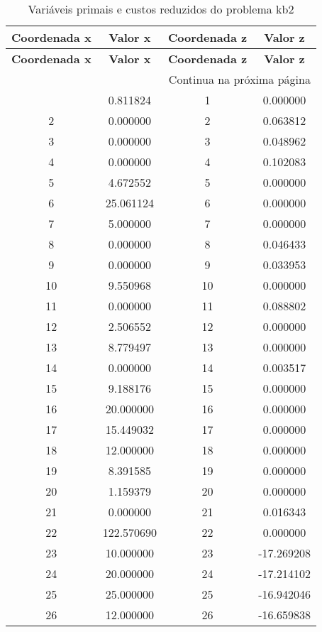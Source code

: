 \documentclass[12pt]{article}
\begin{document}
\begin{longtable}{@{}cccc@{}}
\caption{Variáveis primais e custos reduzidos do problema kb2} \\
\toprule
\textbf{Coordenada x} & \textbf{Valor x} & \textbf{Coordenada z} & \textbf{Valor z} \\
\midrule
\endfirsthead

\toprule
\textbf{Coordenada x} & \textbf{Valor x} & \textbf{Coordenada z} & \textbf{Valor z} \\
\midrule
\endhead

\midrule \multicolumn{4}{r}{{Continua na próxima página}} \\ \midrule
\endfoot

\bottomrule
\endlastfoot
1 & 0.811824 & 1 & 0.000000 \\
2 & 0.000000 & 2 & 0.063812 \\
3 & 0.000000 & 3 & 0.048962 \\
4 & 0.000000 & 4 & 0.102083 \\
5 & 4.672552 & 5 & 0.000000 \\
6 & 25.061124 & 6 & 0.000000 \\
7 & 5.000000 & 7 & 0.000000 \\
8 & 0.000000 & 8 & 0.046433 \\
9 & 0.000000 & 9 & 0.033953 \\
10 & 9.550968 & 10 & 0.000000 \\
11 & 0.000000 & 11 & 0.088802 \\
12 & 2.506552 & 12 & 0.000000 \\
13 & 8.779497 & 13 & 0.000000 \\
14 & 0.000000 & 14 & 0.003517 \\
15 & 9.188176 & 15 & 0.000000 \\
16 & 20.000000 & 16 & 0.000000 \\
17 & 15.449032 & 17 & 0.000000 \\
18 & 12.000000 & 18 & 0.000000 \\
19 & 8.391585 & 19 & 0.000000 \\
20 & 1.159379 & 20 & 0.000000 \\
21 & 0.000000 & 21 & 0.016343 \\
22 & 122.570690 & 22 & 0.000000 \\
23 & 10.000000 & 23 & -17.269208 \\
24 & 20.000000 & 24 & -17.214102 \\
25 & 25.000000 & 25 & -16.942046 \\
26 & 12.000000 & 26 & -16.659838 \\

\end{longtable}
\end{document}
